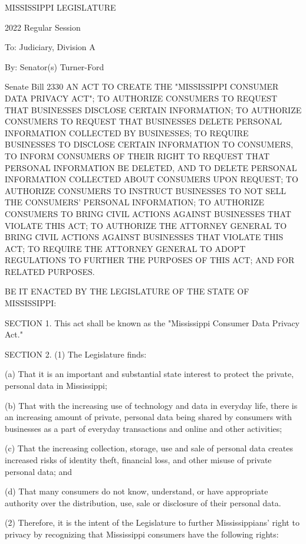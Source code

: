 MISSISSIPPI LEGISLATURE

2022 Regular Session

To: Judiciary, Division A

By: Senator(s) Turner-Ford

Senate Bill 2330
AN ACT TO CREATE THE "MISSISSIPPI CONSUMER DATA PRIVACY ACT"; TO AUTHORIZE CONSUMERS TO REQUEST THAT BUSINESSES DISCLOSE CERTAIN INFORMATION; TO AUTHORIZE CONSUMERS TO REQUEST THAT BUSINESSES DELETE PERSONAL INFORMATION COLLECTED BY BUSINESSES; TO REQUIRE BUSINESSES TO DISCLOSE CERTAIN INFORMATION TO CONSUMERS, TO INFORM CONSUMERS OF THEIR RIGHT TO REQUEST THAT PERSONAL INFORMATION BE DELETED, AND TO DELETE PERSONAL INFORMATION COLLECTED ABOUT CONSUMERS UPON REQUEST; TO AUTHORIZE CONSUMERS TO INSTRUCT BUSINESSES TO NOT SELL THE CONSUMERS' PERSONAL INFORMATION; TO AUTHORIZE CONSUMERS TO BRING CIVIL ACTIONS AGAINST BUSINESSES THAT VIOLATE THIS ACT; TO AUTHORIZE THE ATTORNEY GENERAL TO BRING CIVIL ACTIONS AGAINST BUSINESSES THAT VIOLATE THIS ACT; TO REQUIRE THE ATTORNEY GENERAL TO ADOPT REGULATIONS TO FURTHER THE PURPOSES OF THIS ACT; AND FOR RELATED PURPOSES.

     BE IT ENACTED BY THE LEGISLATURE OF THE STATE OF MISSISSIPPI:

     SECTION 1.  This act shall be known as the "Mississippi Consumer Data Privacy Act."

     SECTION 2.  (1)  The Legislature finds:

          (a)  That it is an important and substantial state interest to protect the private, personal data in Mississippi;

          (b)  That with the increasing use of technology and data in everyday life, there is an increasing amount of private, personal data being shared by consumers with businesses as a part of everyday transactions and online and other activities;

          (c)  That the increasing collection, storage, use and sale of personal data creates increased risks of identity theft, financial loss, and other misuse of private personal data; and

          (d)  That many consumers do not know, understand, or have appropriate authority over the distribution, use, sale or disclosure of their personal data.

     (2)  Therefore, it is the intent of the Legislature to further Mississippians' right to privacy by recognizing that Mississippi consumers have the following rights:

